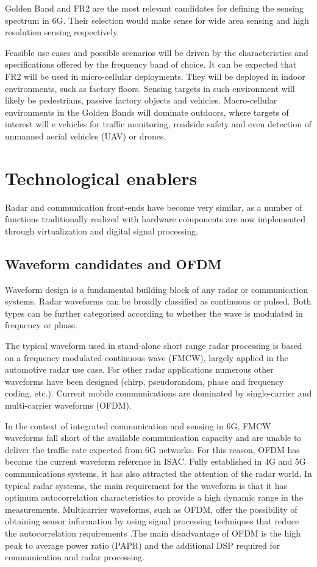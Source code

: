Golden Band and FR2 are the most relevant candidates for defining the sensing spectrum in 6G. Their selection would make sense for wide area sensing and high resolution sensing respectively.

Feasible use cases and possible scenarios will be driven by the characteristics and specifications offered by the frequency band of choice. It can be expected that FR2 will be used in micro-cellular deployments. They will be deployed in indoor environments, such as factory floors. Sensing targets in such environment will likely be pedestrians, passive factory objects and vehicles.
Macro-cellular environments in the Golden Bands will dominate outdoors, where targets of interest will e vehicles for traffic monitoring, roadside safety and even detection of unmanned aerial vehicles (UAV) or drones.

\section{Technological enablers}
	
	Radar and communication front-ends have become very similar, as a number of functions traditionally realized with hardware components are now implemented through virtualization and digital signal processing.
	
	\subsection{Waveform candidates and OFDM}
	
	Waveform design is a fundamental building block of any radar or communication systems. 
	Radar waveforms can be broadly classified as continuous or pulsed. Both types can be further categorised according to whether the wave is modulated in frequency or phase. 
	
	The typical waveform used in stand-alone short range radar processing is based on a frequency modulated continuous wave (FMCW), largely applied in the automotive radar use case. For other radar applications numerous other waveforms have been designed (\eg chirp, pseudorandom, phase and frequency coding, etc.). Current mobile communications are dominated by single-carrier and multi-carrier waveforms (OFDM).
	 
	In the context of integrated communication and sensing in 6G, FMCW waveforms fall short of the available communication capacity and are unable to deliver the traffic rate expected from 6G networks. 
	For this reason, OFDM has become the current waveform reference in ISAC. Fully established in 4G and 5G communications systems, it has also attracted the attention of the radar world.
	In typical radar systems, the main requirement for the waveform is that it has optimum autocorrelation characteristics to provide a high dynamic range in the measurements. Multicarrier waveforms, such as OFDM, offer the possibility of obtaining sensor information by using signal processing techniques that reduce the autocorrelation requirements \cite{Sturm_Wiesbeck_2011}.The main disadvantage of OFDM is the high peak to average power ratio (PAPR) and the additional DSP required for communication and radar processing.
	
